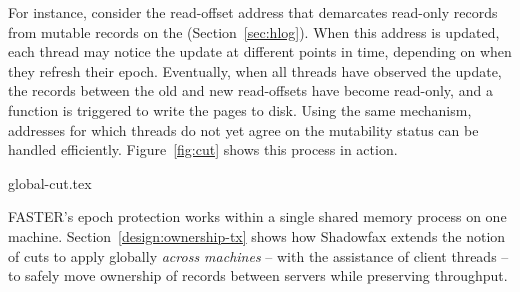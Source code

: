 For instance, consider the read-offset address that demarcates read-only records from mutable
records on the \hlog (Section~\ref{sec:hlog}). When this address is updated, each thread may
notice the update at different points in time, depending on when they refresh their epoch.
Eventually, when all threads have observed the update, the records between the old and new
read-offsets have become read-only, and a function is triggered to write the pages to disk. Using the same
mechanism, addresses for which threads do not yet agree on the mutability status can be handled efficiently.
Figure~\ref{fig:cut} shows this process in action.

 {global-cut.tex}

\iffalse
\faster's checkpointing protocol serves as a great example of this~\cite{cpr}.
%
It first moves all threads from a system checkpoint version $v$ to a
new checkpoint version $v+1$, and then it captures and persists records in
version $v$.
%
As threads process operations, they stamp each new record version they create
with their local checkpoint version number.
%
The boundary between the two checkpoint versions $v$ and $v+1$ forms a
cut across all of the operations of all of the threads (Figure~\ref{fig:cut}).
%
The protocol first increments a process-global variable that contains the
systems' checkpoint version number, and it registers an epoch action
that checkpoints version $v$ when all threads
have observed this new checkpoint version $v+1$.
%
Each thread periodically (or when it encounters specific situations) checks for
epoch actions, which triggers a refresh of each thread's local checkpoint version number.
%
Once each thread has refreshed its local copy of the global checkpoint
version number to $v+1$ all operations before the cut are guaranteed to have
completed.
%
Hence, it is safe to checkpoint version $v$ of the database, which is triggered
by the registered epoch action.
\fi

FASTER's epoch protection works within a single shared memory process on one machine. Section~\ref{design:ownership-tx} shows
how Shadowfax extends the notion of cuts to apply globally \emph{across machines} -- with the assistance of
client threads -- to safely move ownership of records between servers while preserving throughput.

